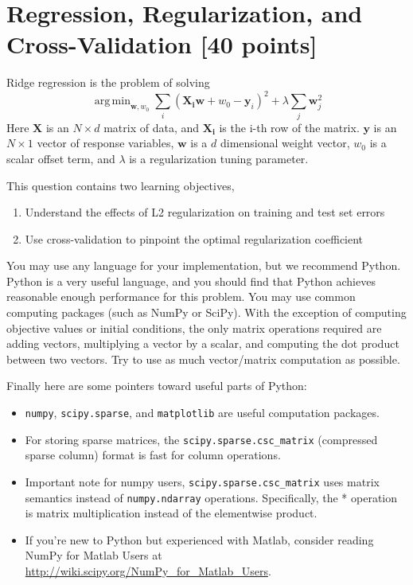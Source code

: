 \documentclass[letterpaper]{article}
\providecommand{\m}[1]{\mathbf{#1}}
\DeclareMathOperator*{\argmin}{arg\,min}
\begin{document}
\section{Regression, Regularization, and Cross-Validation [40 points]}

Ridge regression is the problem of solving
\begin{equation}\label{eq:ridge}
  \argmin_{\m{w}, w_0} \sum_i{ (\m{X_i} \m{w} + w_0 - \m{y}_i)^2 }
    + \lambda \sum_j \m{w}_j^2 
\end{equation}
Here $\m{X}$ is an $N \times d$ matrix of data, and $\m{X_i}$ is the i-th
row of the matrix. $\m{y}$ is an $N \times 1$ vector of response variables,
$\m{w}$ is a $d$ dimensional weight vector, $w_0$ is a
scalar offset term, and $\lambda$ is a regularization tuning parameter.

\noindent
This question contains two learning objectives, 
\begin{enumerate}
\item Understand the effects of L2 regularization on training and test set errors
\item Use cross-validation to pinpoint the optimal regularization coefficient
\end{enumerate}

\noindent You may use any language for your implementation, but we recommend Python.  Python is a very useful language,
and you should find that Python achieves reasonable enough performance for this problem. You may use common computing packages (such as NumPy or SciPy).
\newline \newline \noindent With the exception of computing objective values or initial conditions, the only matrix operations required
  		are adding vectors, multiplying a vector by a scalar, and computing the dot product between two vectors.
        		Try to use as much vector/matrix computation as possible.

\noindent Finally here are some pointers toward useful parts of Python:
\begin{itemize}
  \item \texttt{numpy}, \texttt{scipy.sparse}, and \texttt{matplotlib} are useful computation packages.
  \item For storing sparse matrices, the \texttt{scipy.sparse.csc\_matrix} (compressed sparse column) format 
  		is fast for column operations.           
  \item Important note for numpy users, \texttt{scipy.sparse.csc\_matrix} uses matrix semantics instead of \texttt{numpy.ndarray} operations.
    Specifically, the * operation is matrix multiplication instead of the elementwise product.
  \item If you're new to Python but experienced with Matlab, consider reading NumPy for Matlab Users
  		at \url{http://wiki.scipy.org/NumPy_for_Matlab_Users}.
\end{itemize}
\end{document}
